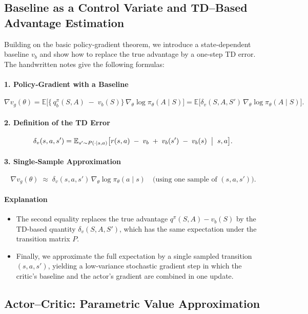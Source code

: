 \subsection{Baseline as a Control Variate and TD–Based Advantage Estimation}

Building on the basic policy‐gradient theorem, we introduce a state‐dependent baseline \(v_b\) and show how to replace the true advantage by a one‐step TD error.  The handwritten notes give the following formulas:

\paragraph{1. Policy‐Gradient with a Baseline}
\[
\nabla v_g(\theta)
=
\mathbb{E}\bigl[\{\,q_b^\pi(S,A)\;-\;v_b(S)\}\,\nabla_\theta\log\pi_\theta(A\mid S)\bigr]
=
\mathbb{E}\bigl[\delta_v(S,A,S')\,\nabla_\theta\log\pi_\theta(A\mid S)\bigr].
\]

\paragraph{2. Definition of the TD Error}
\[
\delta_v(s,a,s')
=
\mathbb{E}_{s'\sim P(\cdot\mid s,a)}
\bigl[r(s,a)\;-\;v_b
\;+\;v_b(s')
\;-\;v_b(s)\;\bigm|\;s,a\bigr].
\]

\paragraph{3. Single‐Sample Approximation}
\[
\nabla v_g(\theta)
\;\approx\;
\delta_v(s,a,s')\,\nabla_\theta\log\pi_\theta(a\mid s)
\quad\text{(using one sample of \((s,a,s')\)).}
\]

\paragraph{Explanation}
\begin{itemize}
  \item The second equality replaces the true advantage \(q^\pi(S,A)-v_b(S)\) by the TD‐based quantity \(\delta_v(S,A,S')\), which has the same expectation under the transition matrix \(P\).
  \item Finally, we approximate the full expectation by a single sampled transition \((s,a,s')\), yielding a low‐variance stochastic gradient step in which the critic’s baseline and the actor’s gradient are combined in one update.
\end{itemize}
\subsection{Actor–Critic: Parametric Value Approximation}

